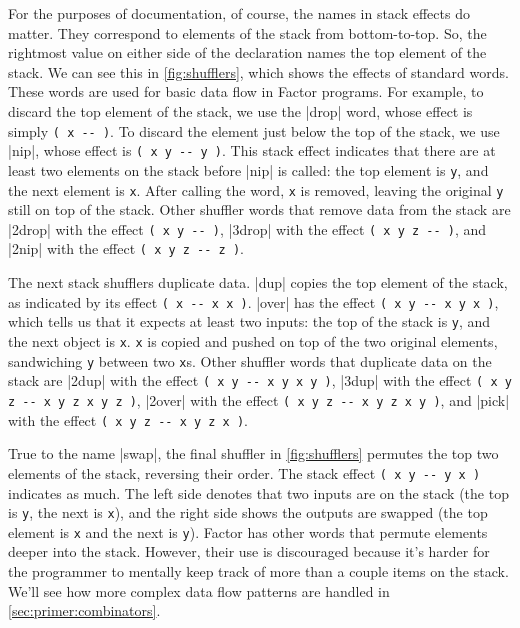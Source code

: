 For the purposes of documentation, of course, the names in stack effects do
matter.  They correspond to elements of the stack from bottom-to-top.  So, the
rightmost value on either side of the declaration names the top element of the
stack.  We can see this in \vref{fig:shufflers}, which shows the effects of
standard  words.  These words are used for basic data flow
in Factor programs.  For example, to discard the top element of the stack, we
use the \factor|drop| word, whose effect is simply
%
\Verb|( x -- )|.
%
To discard the element just below the top of the stack, we use \factor|nip|,
whose effect is
%
\Verb|( x y -- y )|.
%
This stack effect indicates that there are at least two elements on the stack
before \factor|nip| is called: the top element is \Verb|y|, and the next
element is \Verb|x|.  After calling the word, \Verb|x| is removed, leaving
the original \Verb|y| still on top of the stack.  Other shuffler words that
remove data from the stack are
%
\factor|2drop| with the effect \Verb|( x y -- )|,
%
\factor|3drop| with the effect \Verb|( x y z -- )|, and
%
\factor|2nip| with the effect \Verb|( x y z -- z )|.

The next stack shufflers duplicate data.  \factor|dup| copies the top element
of the stack, as indicated by its effect \Verb|( x -- x x )|.  \factor|over|
has the effect \Verb|( x y -- x y x )|, which tells us that it expects at
least two inputs: the top of the stack is \Verb|y|, and the next object is
\Verb|x|.  \Verb|x| is copied and pushed on top of the two original
elements, sandwiching \Verb|y| between two \Verb|x|s.  Other shuffler words
that duplicate data on the stack are
%
\factor|2dup| with the effect \Verb|( x y -- x y x y )|,
%
\factor|3dup| with the effect \Verb|( x y z -- x y z x y z )|,
%
\factor|2over| with the effect \Verb|( x y z -- x y z x y )|, and
%
\factor|pick| with the effect \Verb|( x y z -- x y z x )|.

True to the name \factor|swap|, the final shuffler in \vref{fig:shufflers}
permutes the top two elements of the stack, reversing their order.  The stack
effect
%
\Verb|( x y -- y x )|
%
indicates as much.  The left side denotes that two inputs are on the stack (the
top is \Verb|y|, the next is \Verb|x|), and the right side shows the
outputs are swapped (the top element is \Verb|x| and the next is \Verb|y|).
Factor has other words that permute elements deeper into the stack.  However,
their use is discouraged because it's harder for the programmer to mentally
keep track of more than a couple items on the stack.  We'll see how more
complex data flow patterns are handled in \vref{sec:primer:combinators}.
